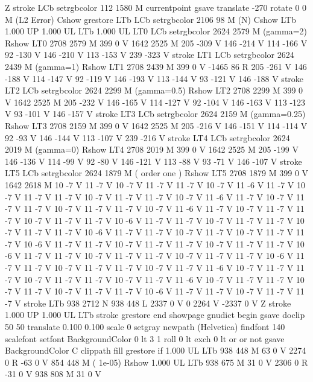 Z stroke
LCb setrgbcolor
112 1580 M
currentpoint gsave translate -270 rotate 0 0 M
(L2 Error) Cshow
grestore
LTb
LCb setrgbcolor
2106 98 M
(N) Cshow
LTb
1.000 UP
1.000 UL
LTb
1.000 UL
LT0
LCb setrgbcolor
2624 2579 M
(gamma=2) Rshow
LT0
2708 2579 M
399 0 V
1642 2525 M
205 -309 V
146 -214 V
114 -166 V
92 -130 V
146 -210 V
113 -153 V
239 -323 V
stroke
LT1
LCb setrgbcolor
2624 2439 M
(gamma=1) Rshow
LT1
2708 2439 M
399 0 V
-1465 86 R
205 -261 V
146 -188 V
114 -147 V
92 -119 V
146 -193 V
113 -144 V
93 -121 V
146 -188 V
stroke
LT2
LCb setrgbcolor
2624 2299 M
(gamma=0.5) Rshow
LT2
2708 2299 M
399 0 V
1642 2525 M
205 -232 V
146 -165 V
114 -127 V
92 -104 V
146 -163 V
113 -123 V
93 -101 V
146 -157 V
stroke
LT3
LCb setrgbcolor
2624 2159 M
(gamma=0.25) Rshow
LT3
2708 2159 M
399 0 V
1642 2525 M
205 -216 V
146 -151 V
114 -114 V
92 -93 V
146 -144 V
113 -107 V
239 -216 V
stroke
LT4
LCb setrgbcolor
2624 2019 M
(gamma=0) Rshow
LT4
2708 2019 M
399 0 V
1642 2525 M
205 -199 V
146 -136 V
114 -99 V
92 -80 V
146 -121 V
113 -88 V
93 -71 V
146 -107 V
stroke
LT5
LCb setrgbcolor
2624 1879 M
( order one ) Rshow
LT5
2708 1879 M
399 0 V
1642 2618 M
10 -7 V
11 -7 V
10 -7 V
11 -7 V
11 -7 V
10 -7 V
11 -6 V
11 -7 V
10 -7 V
11 -7 V
11 -7 V
10 -7 V
11 -7 V
11 -7 V
10 -7 V
11 -6 V
11 -7 V
10 -7 V
11 -7 V
11 -7 V
10 -7 V
11 -7 V
11 -7 V
10 -7 V
11 -6 V
11 -7 V
10 -7 V
11 -7 V
11 -7 V
10 -7 V
11 -7 V
11 -7 V
10 -6 V
11 -7 V
11 -7 V
10 -7 V
11 -7 V
11 -7 V
10 -7 V
11 -7 V
11 -7 V
10 -6 V
11 -7 V
11 -7 V
10 -7 V
11 -7 V
10 -7 V
11 -7 V
11 -7 V
10 -6 V
11 -7 V
11 -7 V
10 -7 V
11 -7 V
11 -7 V
10 -7 V
11 -7 V
11 -7 V
10 -6 V
11 -7 V
11 -7 V
10 -7 V
11 -7 V
11 -7 V
10 -7 V
11 -7 V
11 -7 V
10 -6 V
11 -7 V
11 -7 V
10 -7 V
11 -7 V
11 -7 V
10 -7 V
11 -7 V
11 -6 V
10 -7 V
11 -7 V
11 -7 V
10 -7 V
11 -7 V
11 -7 V
10 -7 V
11 -7 V
11 -6 V
10 -7 V
11 -7 V
11 -7 V
10 -7 V
11 -7 V
10 -7 V
11 -7 V
11 -7 V
10 -6 V
11 -7 V
11 -7 V
10 -7 V
11 -7 V
11 -7 V
stroke
LTb
938 2712 N
938 448 L
2337 0 V
0 2264 V
-2337 0 V
Z stroke
1.000 UP
1.000 UL
LTb
stroke
grestore
end
showpage
gnudict begin
gsave
doclip
50 50 translate
0.100 0.100 scale
0 setgray
newpath
(Helvetica) findfont 140 scalefont setfont
BackgroundColor 0 lt 3 1 roll 0 lt exch 0 lt or or not {gsave BackgroundColor C clippath fill grestore} if
1.000 UL
LTb
938 448 M
63 0 V
2274 0 R
-63 0 V
854 448 M
( 1e-05) Rshow
1.000 UL
LTb
938 675 M
31 0 V
2306 0 R
-31 0 V
938 808 M
31 0 V
